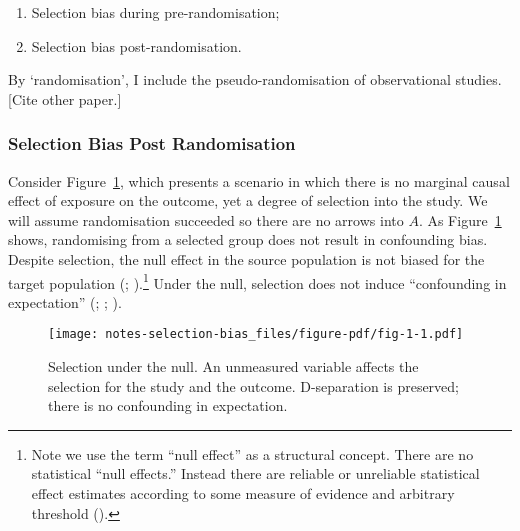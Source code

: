 \documentclass[
  singlecolumn,
  9pt]{article}
\providecommand{\tightlist}{%
  \setlength{\itemsep}{0pt}\setlength{\parskip}{0pt}}\usepackage{longtable,booktabs,array}
\begin{document}
\begin{enumerate}
\def\labelenumi{(\arabic{enumi})}
\tightlist
\item
  Selection bias during pre-randomisation;
\item
  Selection bias post-randomisation.
\end{enumerate}

By `randomisation', I include the pseudo-randomisation of observational
studies. {[}Cite other paper.{]}

\subsubsection{Selection Bias Post
Randomisation}\label{selection-bias-post-randomisation}

Consider Figure~\ref{fig-1}, which presents a scenario in which there is
no marginal causal effect of exposure on the outcome, yet a degree of
selection into the study. We will assume randomisation succeeded so
there are no arrows into \(A\). As Figure~\ref{fig-1} shows, randomising
from a selected group does not result in confounding bias. Despite
selection, the null effect in the source population is not biased for
the target population (;
).\footnote{Note we use the
  term ``null effect'' as a structural concept. There are no statistical
  ``null effects.'' Instead there are reliable or unreliable statistical
  effect estimates according to some measure of evidence and arbitrary
  threshold ().}
Under the null, selection does not induce ``confounding in expectation''
(;
;
).

\begin{figure}

{\centering \texttt{[image: notes-selection-bias\_files/figure-pdf/fig-1-1.pdf]}

}

\caption{\label{fig-1}Selection under the null. An unmeasured variable
affects the selection for the study and the outcome. D-separation is
preserved; there is no confounding in expectation.}

\end{figure}
\end{document}
